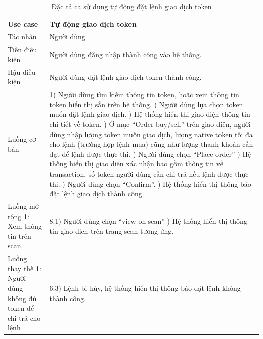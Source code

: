 \begin{table}[H]
    \centering
    \begin{tabular}{|p{5cm}|p{8cm}|}
        \hline
        Use case                                                        & Tự động giao dịch token                                          \\
        \hline
        Tác nhân                                                        & Người dùng                                                       \\
        \hline
        Tiền điều kiện                                                  & Người dùng đăng nhập thành công vào hệ thống.                    \\
        \hline
        Hậu điều kiện                                                   & Người dùng đặt lệnh giao dịch token thành công.                  \\
        \hline
        Luồng cơ bản                                                    & 1) Người dùng tìm kiếm thông tin token, hoặc xem thông tin token
        hiển thị sẵn trên hệ thống. \newline
        2) Người dùng lựa chọn token muốn đặt lệnh giao dịch. \newline
        3) Hệ thống hiển thị giao diện thông tin chi tiết về token. \newline
        4) Ở mục ``Order buy/sell'' trên giao diện, người dùng nhập lượng token muốn
        giao dịch, lượng native token tối đa cho lệnh (trường hợp lệnh mua) cũng như
        lượng thanh khoản cần đạt để lệnh được thực thi. \newline
        5) Người dùng chọn ``Place order'' \newline
        6) Hệ thống hiển thị giao diện xác nhận bao gồm thông tin về transaction, số
        token người dùng cần chi trả nếu lệnh được thực thi. \newline
        7) Người dùng chọn ``Confirm''. \newline
        8) Hệ thống hiển thị thông báo đặt lệnh giao dịch thành công.                                                                      \\
        \hline
        Luồng mở rộng 1: Xem thông tin trên scan                        & 8.1) Người dùng chọn ``view on
        scan'' \newline
        9.1) Hệ thống hiển thị thông tin giao dịch trên trang scan tương ứng.                                                              \\
        \hline
        Luồng thay thế 1: Người dùng không đủ token để chi trả cho lệnh & 6.3) Lệnh bị
        hủy, hệ thống hiển thị thông báo đặt lệnh không thành công.                                                                        \\
        \hline
    \end{tabular}
    \caption{Đặc tả ca sử dụng tự động đặt lệnh giao dịch token}
    \label{tab:auto-order-token}
\end{table}

